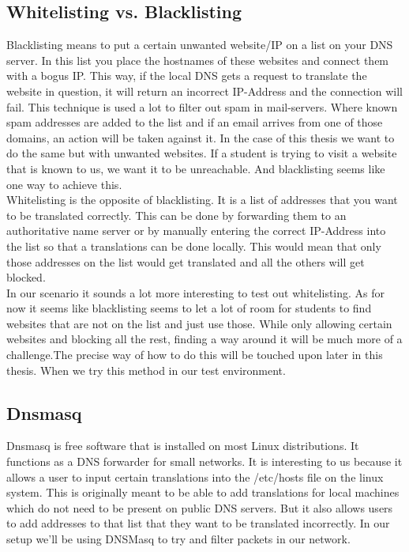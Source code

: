 \subsection{Whitelisting vs. Blacklisting}
Blacklisting means to put a certain unwanted website/IP on a list on your DNS server. In this list you place the hostnames of these websites and connect them with a bogus IP. This way, if the local DNS gets a request to translate the website in question, it will return an incorrect IP-Address and the connection will fail. This technique is used a lot to filter out spam in mail-servers. Where known spam addresses are added to the list and if an email arrives from one of those domains, an action will be taken against it. In the case of this thesis we want to do the same but with unwanted websites. If a student is trying to visit a website that is known to us, we want it to be unreachable. And blacklisting seems like one way to achieve this.\\
Whitelisting is the opposite of blacklisting. It is a list of addresses that you want to be translated correctly. This can be done by forwarding them to an authoritative name server or by manually entering the correct IP-Address into the list so that a translations can be done locally. This would mean that only those addresses on the list would get translated and all the others will get blocked.\\
In our scenario it sounds a lot more interesting to test out whitelisting. As for now it seems like blacklisting seems to let a lot of room for students to find websites that are not on the list and just use those. While only allowing certain websites and blocking all the rest, finding a way around it will be much more of a challenge.The precise way of how to do this will be touched upon later in this thesis. When we try this method in our test environment.
\subsection{Dnsmasq}
Dnsmasq is free software that is installed on most Linux distributions. It functions as a DNS forwarder for small networks. It is interesting to us because it allows a user to input certain translations into the /etc/hosts file on the linux system. This is originally meant to be able to add translations for local machines which do not need to be present on public DNS servers. But it also allows users to add addresses to that list that they want to be translated incorrectly. In our setup we'll be using DNSMasq to try and filter packets in our network.
